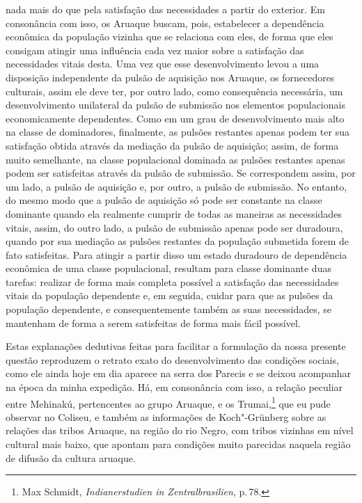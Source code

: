 nada mais do que pela satisfação das necessidades a partir do exterior.
Em consonância com isso, os Aruaque buscam, pois, estabelecer a
dependência econômica da população vizinha que se relaciona com eles, de
forma que eles consigam atingir uma influência cada vez maior sobre a
satisfação das necessidades vitais desta. Uma vez que esse
desenvolvimento levou a uma disposição independente da pulsão de
aquisição nos Aruaque, os fornecedores culturais, assim ele deve ter,
por outro lado, como consequência necessária, um desenvolvimento
unilateral da pulsão de submissão nos elementos populacionais
economicamente dependentes. Como em um grau de desenvolvimento mais alto
na classe de dominadores, finalmente, as pulsões restantes apenas podem
ter sua satisfação obtida através da mediação da pulsão de aquisição;
assim, de forma muito semelhante, na classe populacional dominada as
pulsões restantes apenas podem ser satisfeitas através da pulsão de
submissão. Se correspondem assim, por um lado, a pulsão de aquisição e,
por outro, a pulsão de submissão. No entanto, do mesmo modo que a pulsão
de aquisição só pode ser constante na classe dominante quando ela
realmente cumprir de todas as maneiras as necessidades vitais, assim, do
outro lado, a pulsão de submissão apenas pode ser duradoura, quando por
sua mediação as pulsões restantes da população submetida forem de fato
satisfeitas. Para atingir a partir disso um estado duradouro de
dependência econômica de uma classe populacional, resultam para classe
dominante duas tarefas: realizar de forma mais completa possível a
satisfação das necessidades vitais da população dependente e, em
seguida, cuidar para que as pulsões da população dependente, e
consequentemente também as suas necessidades, se mantenham de forma a
serem satisfeitas de forma mais fácil possível.

Estas explanações dedutivas feitas para facilitar a formulação da nossa
presente questão reproduzem o retrato exato do desenvolvimento das
condições sociais, como ele ainda hoje em dia aparece na serra dos
Parecis e se deixou acompanhar na época da minha expedição. Há, em
consonância com isso, a relação peculiar entre Mehinakú, pertencentes ao
grupo Aruaque, e os Trumai,\footnote{Max Schmidt, \textit{Indianerstudien
  in Zentralbrasilien}, p.\,78.} que eu pude observar no Coliseu, e
também as informações de Koch"-Grünberg sobre as relações das tribos
Aruaque, na região do rio Negro, com tribos vizinhas em nível cultural
mais baixo, que apontam para condições muito parecidas naquela região
de difusão da cultura aruaque.

